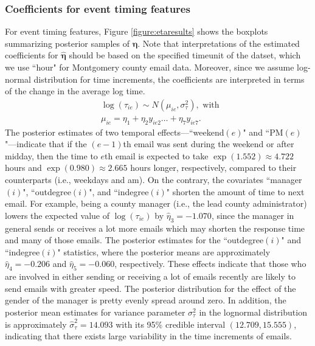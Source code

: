 \documentclass[ba]{imsart}
\numberwithin{equation}{section}
\theoremstyle{plain}
\begin{document}
	\subsubsection{Coefficients for event timing features}
	For event timing features, Figure \ref{figure:etaresults} shows the boxplots summarizing posterior samples of $\boldsymbol{\eta}$. Note that interpretations of the estimated coefficients for $\hat{\boldsymbol{\eta}}$ should be based on the specified timeunit of the datset, which we use ``hour" for Montgomery county email data. Moreover, since we assume log-normal distribution for time increments, the coefficients are interpreted in terms of the change in the average log time.
	\begin{equation*}
		\begin{aligned}
			&\log(\tau_{ie}) \sim N(\mu_{ie}, \sigma_\tau^2), \mbox{ with }\\
			&\mu_{ie} = \eta_{1}+\eta_{2} y_{ie2}\ldots+\eta_{7}y_{ie7}.
		\end{aligned}
	\end{equation*}
	The posterior estimates of two temporal effects---``weekend$(e)$" and ``PM$(e)$"---indicate that if the ${(e-1)}$th email was sent during the weekend or after midday, then the time to $e$th email is expected to take $\exp(1.552)\approx 4.722$ hours and $\exp(0.980)\approx2.665$ hours longer, respectively, compared to their counterparts (i.e., weekdays and am). On the contrary, the covariates ``manager$(i)$", ``outdegree$(i)$", and ``indegree$(i)$"  shorten the amount of time to next email. For example, being a county manager (i.e., the lead county administrator) lowers the expected value of $\log(\tau_{ie})$ by $\hat{\eta}_3 = -1.070$, since the manager in general sends or receives a lot more emails which may shorten the response time and many of those emails. The posterior estimates for the  ``outdegree$(i)$" and ``indegree$(i)$" statistics, where the posterior means are approximately $\hat{\eta}_4=-0.206$ and $\hat{\eta}_5=-0.060$, respectively. These effects indicate that those who are involved in either sending or receiving a lot of emails recently are likely to send emails with greater speed. The posterior distribution for the effect of the gender of the manager is pretty evenly spread around zero. In addition, the posterior mean estimates for variance parameter $\sigma^2_\tau$ in the lognormal distribution is approximately $\hat{\sigma}^2_\tau=14.093$ with its 95\% credible interval $(12.709, 15.555)$, indicating that there exists large variability in the time increments of emails.
\end{document}
